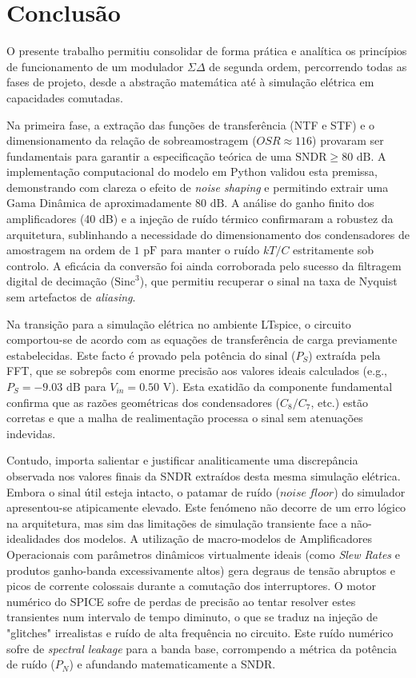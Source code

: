 \section{Conclusão}
\label{sec:conclusao}

O presente trabalho permitiu consolidar de forma prática e analítica os princípios de funcionamento de um
modulador $\Sigma\Delta$ de segunda ordem, percorrendo todas as fases de projeto, desde a abstração matemática
até à simulação elétrica em capacidades comutadas.

Na primeira fase, a extração das funções de transferência (NTF e STF) e o dimensionamento da relação de
sobreamostragem ($OSR \approx 116$) provaram ser fundamentais para garantir a especificação teórica de
uma $\text{SNDR} \ge 80\text{ dB}$. A implementação computacional do modelo em Python validou esta premissa,
demonstrando com clareza o efeito de \textit{noise shaping} e permitindo extrair uma Gama Dinâmica de
aproximadamente $80\text{ dB}$. A análise do ganho finito dos amplificadores (40 dB) e a injeção de
ruído térmico confirmaram a robustez da arquitetura, sublinhando a necessidade do dimensionamento dos
condensadores de amostragem na ordem de $1\text{ pF}$ para manter o ruído $kT/C$ estritamente sob controlo.
A eficácia da conversão foi ainda corroborada pelo sucesso da filtragem digital de decimação ($\text{Sinc}^3$),
que permitiu recuperar o sinal na taxa de Nyquist sem artefactos de \textit{aliasing}.

Na transição para a simulação elétrica no ambiente LTspice, o circuito comportou-se de acordo com as
equações de transferência de carga previamente estabelecidas. Este facto é provado pela
potência do sinal ($P_S$) extraída pela FFT, que se sobrepôs com enorme precisão aos valores ideais
calculados (e.g., $P_S = -9.03\text{ dB}$ para $V_{in} = 0.50\text{ V}$). Esta exatidão da componente
fundamental confirma que as razões geométricas dos condensadores ($C_8/C_7$, etc.) estão corretas e que a 
malha de realimentação processa o sinal sem atenuações indevidas.

Contudo, importa salientar e justificar analiticamente uma discrepância observada nos valores finais da
SNDR extraídos desta mesma simulação elétrica. Embora o sinal útil esteja intacto, o patamar de ruído
($noise~floor$) do simulador apresentou-se atipicamente elevado. Este fenómeno não decorre de um erro
lógico na arquitetura, mas sim das limitações de simulação transiente face a não-idealidades dos modelos.
A utilização de macro-modelos de Amplificadores Operacionais com parâmetros dinâmicos virtualmente ideais
(como \textit{Slew Rates} e produtos ganho-banda excessivamente altos) gera degraus de tensão abruptos e
picos de corrente colossais durante a comutação dos interruptores. O motor numérico do SPICE sofre de perdas
de precisão ao tentar resolver estes transientes num intervalo de tempo diminuto, o que se traduz na injeção
de "glitches" irrealistas e ruído de alta frequência no circuito. Este ruído numérico sofre de
\textit{spectral leakage} para a banda base, corrompendo a métrica da potência de ruído ($P_N$) e afundando
matematicamente a SNDR.


